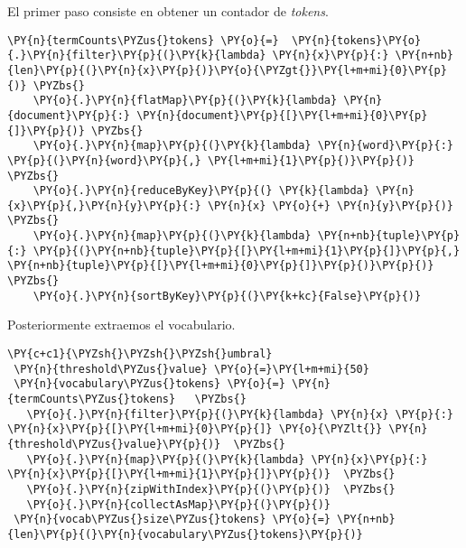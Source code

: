 El primer paso consiste en obtener un contador de \textit{tokens}.
\vspace{0.5cm}

    \begin{tcolorbox}[breakable, size=fbox, boxrule=1pt, pad at break*=1mm,colback=cellbackground, colframe=cellborder]
\begin{Verbatim}[commandchars=\\\{\}]
\PY{n}{termCounts\PYZus{}tokens} \PY{o}{=}  \PY{n}{tokens}\PY{o}{.}\PY{n}{filter}\PY{p}{(}\PY{k}{lambda} \PY{n}{x}\PY{p}{:} \PY{n+nb}{len}\PY{p}{(}\PY{n}{x}\PY{p}{)}\PY{o}{\PYZgt{}}\PY{l+m+mi}{0}\PY{p}{)} \PYZbs{}
    \PY{o}{.}\PY{n}{flatMap}\PY{p}{(}\PY{k}{lambda} \PY{n}{document}\PY{p}{:} \PY{n}{document}\PY{p}{[}\PY{l+m+mi}{0}\PY{p}{]}\PY{p}{)} \PYZbs{}
    \PY{o}{.}\PY{n}{map}\PY{p}{(}\PY{k}{lambda} \PY{n}{word}\PY{p}{:} \PY{p}{(}\PY{n}{word}\PY{p}{,} \PY{l+m+mi}{1}\PY{p}{)}\PY{p}{)} \PYZbs{}
    \PY{o}{.}\PY{n}{reduceByKey}\PY{p}{(} \PY{k}{lambda} \PY{n}{x}\PY{p}{,}\PY{n}{y}\PY{p}{:} \PY{n}{x} \PY{o}{+} \PY{n}{y}\PY{p}{)}   \PYZbs{}
    \PY{o}{.}\PY{n}{map}\PY{p}{(}\PY{k}{lambda} \PY{n+nb}{tuple}\PY{p}{:} \PY{p}{(}\PY{n+nb}{tuple}\PY{p}{[}\PY{l+m+mi}{1}\PY{p}{]}\PY{p}{,} \PY{n+nb}{tuple}\PY{p}{[}\PY{l+m+mi}{0}\PY{p}{]}\PY{p}{)}\PY{p}{)}  \PYZbs{}
    \PY{o}{.}\PY{n}{sortByKey}\PY{p}{(}\PY{k+kc}{False}\PY{p}{)}
\end{Verbatim}
\end{tcolorbox}

Posteriormente extraemos el vocabulario.

\vspace{0.5cm}

   \begin{tcolorbox}[breakable, size=fbox, boxrule=1pt, pad at break*=1mm,colback=cellbackground, colframe=cellborder]
 \begin{Verbatim}[commandchars=\\\{\}]
 \PY{c+c1}{\PYZsh{}\PYZsh{}\PYZsh{}umbral}
 \PY{n}{threshold\PYZus{}value} \PY{o}{=}\PY{l+m+mi}{50} 
 \PY{n}{vocabulary\PYZus{}tokens} \PY{o}{=} \PY{n}{termCounts\PYZus{}tokens}   \PYZbs{}
   \PY{o}{.}\PY{n}{filter}\PY{p}{(}\PY{k}{lambda} \PY{n}{x} \PY{p}{:} \PY{n}{x}\PY{p}{[}\PY{l+m+mi}{0}\PY{p}{]} \PY{o}{\PYZlt{}} \PY{n}{threshold\PYZus{}value}\PY{p}{)}  \PYZbs{}
   \PY{o}{.}\PY{n}{map}\PY{p}{(}\PY{k}{lambda} \PY{n}{x}\PY{p}{:} \PY{n}{x}\PY{p}{[}\PY{l+m+mi}{1}\PY{p}{]}\PY{p}{)}  \PYZbs{}
   \PY{o}{.}\PY{n}{zipWithIndex}\PY{p}{(}\PY{p}{)}  \PYZbs{}
   \PY{o}{.}\PY{n}{collectAsMap}\PY{p}{(}\PY{p}{)}
 \PY{n}{vocab\PYZus{}size\PYZus{}tokens} \PY{o}{=} \PY{n+nb}{len}\PY{p}{(}\PY{n}{vocabulary\PYZus{}tokens}\PY{p}{)}
 \end{Verbatim}
 \end{tcolorbox}

